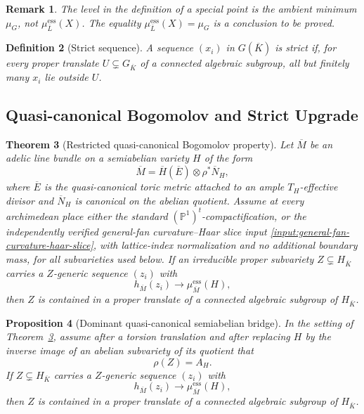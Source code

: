 \documentclass[10pt,a4paper]{amsart}
\theoremstyle{plain}
\newtheorem{theorem}{Theorem}
\newtheorem{definition}[theorem]{Definition}
\newtheorem{proposition}[theorem]{Proposition}
\newtheorem{remark}[theorem]{Remark}
\theoremstyle{plain}
\numberwithin{equation}{section}
\providecommand{\bL}{\overline{L}}
\providecommand{\bN}{\overline{N}}
\providecommand{\bE}{\overline{E}}
\providecommand{\bM}{\overline{M}}
\providecommand{\muess}{\mu^{\mathrm{ess}}}
\begin{document}
\begin{remark}
	The level in the definition of a special point is the ambient minimum
	\(\mu_G\), not \(\muess_{\bL}(X)\).  The equality
	\(\muess_{\bL}(X)=\mu_G\) is a conclusion to be proved.
\end{remark}

\begin{definition}[Strict sequence]
	A sequence \((x_i)\) in \(G(\overline{K})\) is strict if, for every proper translate
	\(U\subsetneq G_{\overline{K}}\) of a connected algebraic subgroup, all but finitely many
	\(x_i\) lie outside \(U\).
\end{definition}

\subsection{Quasi-canonical Bogomolov and Strict Upgrade}

\begin{theorem}[Restricted quasi-canonical Bogomolov property]
	\label{thm:qcanonical-bogomolov}
	\label{input:qbog}
	Let \(\bM\) be an adelic line bundle on a semiabelian variety \(H\) of the form
	\[
	\bM=\overline H(\bE)\otimes \rho^*\bN_H,
	\]
	where \(\bE\) is the quasi-canonical toric metric attached to an ample
	\(T_H\)-effective divisor and \(\bN_H\) is canonical on the abelian quotient.
	Assume at every archimedean place either the standard
	\((\mathbb P^1)^t\)-compactification, or the independently verified
	general-fan curvature--Haar slice input
	\ref{input:general-fan-curvature-haar-slice}, with lattice-index normalization
	and no additional boundary mass, for all subvarieties used below.
	If an irreducible proper subvariety \(Z\subsetneq H_{\overline K}\) carries a
	\(Z\)-generic sequence \((z_i)\) with
	\[
	h_{\bM}(z_i)\longrightarrow \muess_{\bM}(H),
	\]
	then \(Z\) is contained in a proper translate of a connected algebraic subgroup
	of \(H_{\overline K}\).
\end{theorem}

\begin{proposition}[Dominant quasi-canonical semiabelian bridge]
	\label{prop:qbog-dominant-bridge}
	\label{input:qbog-dominant-bridge}
	In the setting of Theorem~\ref{thm:qcanonical-bogomolov}, assume after a torsion translation
	and after replacing \(H\) by the inverse image of an abelian subvariety of its
	quotient that
	\[
	\rho(Z)=A_H.
	\]
	If \(Z\subsetneq H_{\overline K}\) carries a \(Z\)-generic sequence
	\((z_i)\) with
	\[
	h_{\bM}(z_i)\longrightarrow \muess_{\bM}(H),
	\]
	then \(Z\) is contained in a proper translate of a connected algebraic subgroup
	of \(H_{\overline K}\).
\end{proposition}
\end{document}
